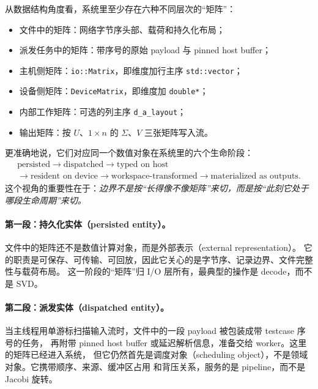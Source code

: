 从数据结构角度看，系统里至少存在六种不同层次的“矩阵”：

\begin{itemize}
    \item 文件中的矩阵：网络字节序头部、载荷和持久化布局；
    \item 派发任务中的矩阵：带序号的原始 payload 与 pinned host buffer；
    \item 主机侧矩阵：\texttt{io::Matrix}，即维度加行主序 \texttt{std::vector}；
    \item 设备侧矩阵：\texttt{DeviceMatrix}，即维度加 \texttt{double*}；
    \item 内部工作矩阵：可选的列主序 \texttt{d\_a\_layout}；
    \item 输出矩阵：按 \(U\)、\(1\times n\) 的 \(\Sigma\)、\(V\) 三张矩阵写入流。
\end{itemize}

更准确地说，它们对应同一个数值对象在系统里的六个生命阶段：
\[
    \begin{gathered}
        \text{persisted}
        \rightarrow
        \text{dispatched}
        \rightarrow
        \text{typed on host} \\
        \rightarrow
        \text{resident on device}
        \rightarrow
        \text{workspace-transformed}
        \rightarrow
        \text{materialized as outputs}.
    \end{gathered}
\]
这个视角的重要性在于：\emph{边界不是按“长得像不像矩阵”来切，而是按“此刻它处于哪段生命周期”来切。}

\paragraph{第一段：持久化实体（persisted entity）。}
文件中的矩阵还不是数值计算对象，而是外部表示（external representation）。
它的职责是可保存、可传输、可回放，因此它关心的是字节序、记录边界、文件完整性与载荷布局。
这一阶段的“矩阵”归 I/O 层所有，最典型的操作是 decode，而不是 SVD。

\paragraph{第二段：派发实体（dispatched entity）。}
当主线程用单游标扫描输入流时，文件中的一段 payload 被包装成带 testcase 序号的任务，
再附带 pinned host buffer 或延迟解析信息，准备交给 worker。这里的矩阵已经进入系统，
但它仍然首先是调度对象（scheduling object），不是领域对象。它携带顺序、来源、缓冲区占用
和背压关系，服务的是 pipeline，而不是 Jacobi 旋转。

